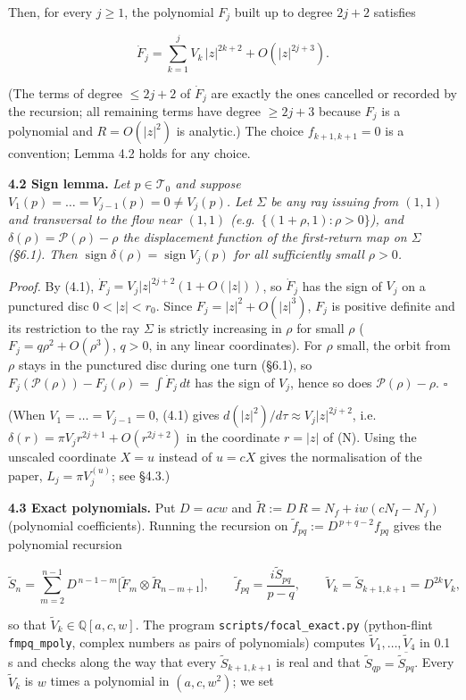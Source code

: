 \documentclass[11pt,a4paper]{report}
\begin{document}
Then, for every \(j\ge1\), the polynomial \(F_j\) built up to degree \(2j+2\) satisfies

\[\dot F_j=\sum_{k=1}^{j}V_k\,|z|^{2k+2}+O(|z|^{2j+3}). \tag{4.1}\]

(The terms of degree \(\le 2j+2\) of \(\dot F_j\) are exactly the ones cancelled or recorded by the recursion;
all remaining terms have degree \(\ge2j+3\) because \(F_j\) is a polynomial and \(R=O(|z|^2)\) is analytic.)
The choice \(f_{k+1,k+1}=0\) is a convention; Lemma 4.2 holds for any choice.

\textbf{4.2 Sign lemma.} \emph{Let \(p\in\mathcal T_0\) and suppose \(V_1(p)=\dots=V_{j-1}(p)=0\ne V_j(p)\). Let \(\Sigma\) be
any ray issuing from \((1,1)\) and transversal to the flow near \((1,1)\) (e.g.~\(\{(1+\rho,1):\rho>0\}\)), and
\(\delta(\rho)=\mathcal P(\rho)-\rho\) the displacement function of the first-return map on \(\Sigma\) (§6.1).
Then \(\operatorname{sign}\delta(\rho)=\operatorname{sign}V_j(p)\) for all sufficiently small \(\rho>0\).}

\emph{Proof.} By (4.1), \(\dot F_j=V_j|z|^{2j+2}(1+O(|z|))\), so \(\dot F_j\) has the sign of \(V_j\) on a punctured
disc \(0<|z|<r_0\). Since \(F_j=|z|^2+O(|z|^3)\), \(F_j\) is positive definite and its restriction to the ray
\(\Sigma\) is strictly increasing in \(\rho\) for small \(\rho\) (\(F_j=q\rho^2+O(\rho^3)\), \(q>0\), in any linear
coordinates). For \(\rho\) small, the orbit from \(\rho\) stays in the punctured disc during one turn (§6.1), so
\(F_j(\mathcal P(\rho))-F_j(\rho)=\int\dot F_j\,dt\) has the sign of \(V_j\), hence so does
\(\mathcal P(\rho)-\rho\). \(\square\)

(When \(V_1=\dots=V_{j-1}=0\), (4.1) gives \(d(|z|^2)/d\tau\approx V_j|z|^{2j+2}\), i.e.
\(\delta(r)=\pi V_j r^{2j+1}+O(r^{2j+2})\) in the coordinate \(r=|z|\) of (N). Using the unscaled coordinate
\(X=u\) instead of \(u=cX\) gives the normalisation of the paper, \(L_j=\pi V_j^{(u)}\); see §4.3.)

\textbf{4.3 Exact polynomials.} Put \(D=acw\) and \(\tilde R:=D\,R=N_f+iw(cN_I-N_f)\) (polynomial coefficients).
Running the recursion on \(\tilde f_{pq}:=D^{\,p+q-2}f_{pq}\) gives the polynomial recursion

\[\tilde S_n=\sum_{m=2}^{n-1}D^{\,n-1-m}\big[\tilde F_m\otimes\tilde R_{n-m+1}\big],\qquad
\tilde f_{pq}=\frac{i\tilde S_{pq}}{p-q},\qquad \tilde V_k=\tilde S_{k+1,k+1}=D^{2k}V_k ,\]

so that \(\tilde V_k\in\mathbb Q[a,c,w]\). The program \texttt{scripts/focal\_exact.py} (python-flint \texttt{fmpq\_mpoly},
complex numbers as pairs of polynomials) computes \(\tilde V_1,\dots,\tilde V_4\) in 0.1 s and checks along the
way that every \(\tilde S_{k+1,k+1}\) is real and that \(\tilde S_{qp}=\overline{\tilde S_{pq}}\). Every
\(\tilde V_k\) is \(w\) times a polynomial in \((a,c,w^2)\); we set
\end{document}
